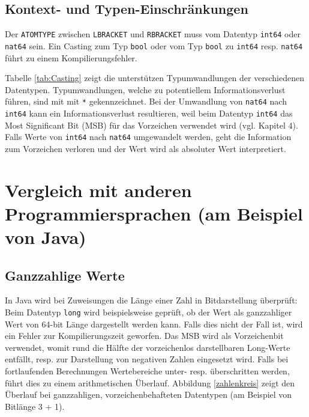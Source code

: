 \documentclass[10pt, a4paper, twocolumn]{article} %
\begin{document}
\subsection{Kontext- und Typen-Einschränkungen}
Der \texttt{ATOMTYPE} zwischen \texttt{LBRACKET} und \texttt{RBRACKET} muss vom Datentyp \texttt{int64} oder \texttt{nat64} sein.
Ein Casting zum Typ \texttt{bool} oder vom Typ \texttt{bool} zu \texttt{int64} resp. \texttt{nat64} führt zu einem Kompilierungsfehler.

Tabelle \ref{tab:Casting} zeigt die unterstützen Typumwandlungen der verschiedenen Datentypen.
Typumwandlungen, welche zu potentiellem Informationsverlust führen, sind mit mit \texttt{*} gekennzeichnet.
Bei der Umwandlung von \texttt{nat64} nach \texttt{int64} kann ein Informationsverlust resultieren, weil beim Datentyp \texttt{int64} das Most Significant Bit (MSB) für das Vorzeichen verwendet wird (vgl. Kapitel 4). %
Falls Werte von \texttt{int64} nach \texttt{nat64} umgewandelt werden, geht die Information zum Vorzeichen verloren und der Wert wird als absoluter Wert interpretiert.
\begin{table}[h]
    \tiny
    \centering
    \caption{Casting zwischen Datentypen}
    \label{tab:Casting}
\end{table}

\section{Vergleich mit anderen Programmiersprachen (am Beispiel von Java)}
\subsection{Ganzzahlige Werte}
In Java wird bei Zuweisungen die Länge einer Zahl in Bitdarstellung überprüft:
Beim Datentyp \texttt{long} wird beispielsweise geprüft, ob der Wert als ganzzahliger Wert von 64-bit Länge dargestellt werden kann.
Falls dies nicht der Fall ist, wird ein Fehler zur Kompilierungszeit geworfen.
Das MSB wird als Vorzeichenbit verwendet, womit rund die Hälfte der vorzeichenlos darstellbaren Long-Werte entfällt, resp. zur Darstellung von negativen Zahlen eingesetzt wird.
Falls bei fortlaufenden Berechnungen Wertebereiche unter- resp. überschritten werden, führt dies zu einem arithmetischen Überlauf.
Abbildung \ref{zahlenkreis} %
zeigt den Überlauf bei ganzzahligen, vorzeichenbehafteten Datentypen (am Beispiel von Bitlänge 3 + 1).
\end{document}
